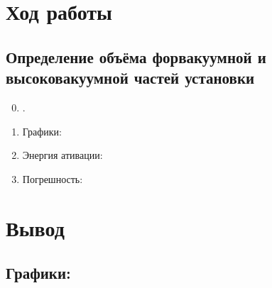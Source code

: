 \documentclass[11pt,a4paper]{article}
\begin{document}
\section*{Ход работы}
\subsection*{Определение объёма форвакуумной и высоковакуумной
частей установки}
\begin{enumerate}
  \setcounter{enumi}{-1}
  \item .
  \item Графики:
  \item Энергия ативации:
  \item Погрешность:
\end{enumerate}

\section*{Вывод}
\subsection*{\textbf{Графики:}}
\begin{figure}[h]
  \label{fig:graph1}
\end{figure}
\newpage
\begin{figure}[h]
  \label{fig:graph2}
\end{figure}
\end{document}
